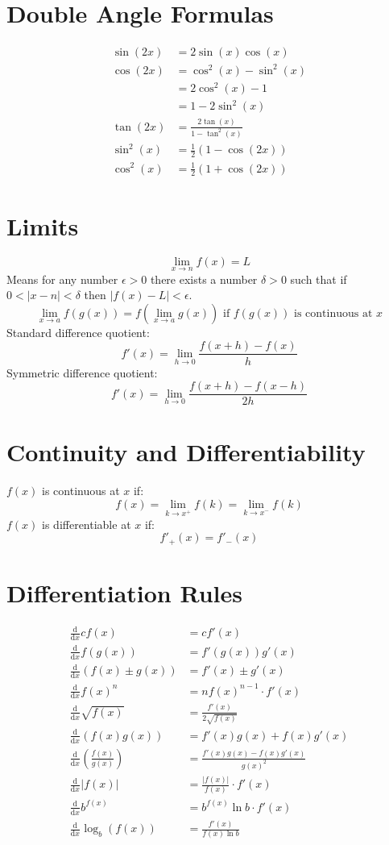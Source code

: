 \documentclass[12pt]{article}
\newcommand*{\rmaskip}{\setlength{\abovedisplayskip}{0pt}}
\newcommand*{\rmbskip}{\setlength{\belowdisplayskip}{0pt}}
\newcommand*{\rmskip}{\rmaskip \rmbskip}
\newcommand*{\dd}[3][]{\tfrac{\mathrm{d}^{#1}#2}{\mathrm{d}#3^{#1}}}
\begin{document}
\section*{Double Angle Formulas}
{\rmskip\begin{align*}
  \sin(2x) &= 2\sin(x)\cos(x)\\
  \cos(2x) &= \cos^2(x) - \sin^2(x)\\
    &= 2\cos^2(x) - 1\\
    &= 1-2\sin^2(x)\\
  \tan(2x) &= \frac{2\tan(x)}{1 - \tan^2(x)}\\
  \sin^2(x) &= \frac{1}{2}(1-\cos(2x))\\
  \cos^2(x) &= \frac{1}{2}(1+\cos(2x))
\end{align*}}%
\section*{Limits}
\[
  \lim_{x \to n} f(x) = L
\]
Means for any number \(\epsilon > 0\) there exists a number \(\delta > 0\) such
that if \(0 < |x - n| < \delta\) then \(|f(x) - L| < \epsilon\).
\[
  \lim_{x \to a}f(g(x)) = f\left(\lim_{x \to a}g(x)\right) \text{ if } f(g(x))
  \text{ is continuous at } x
\]
Standard difference quotient:
\[
  f'(x) = \lim_{h \to 0}\frac{f(x+h) - f(x)}{h}
\]
Symmetric difference quotient:
\[
  f'(x) = \lim_{h \to 0}\frac{f(x+h) - f(x-h)}{2h}
\]
\section*{Continuity and Differentiability}
\(f(x)\) is continuous at \(x\) if:
\[
  f(x) = \lim_{k \to x^+}f(k) = \lim_{k \to x^-}f(k)
\]
\(f(x)\) is differentiable at \(x\) if:
\[
  f'_+(x) = f'_-(x)
\]
\section*{Differentiation Rules}
{\rmskip\begin{align*}
  \dd{}{x}c f(x) &= c f'(x)\\
  \dd{}{x}f(g(x)) &= f'(g(x))g'(x)\\
  \dd{}{x}(f(x) \pm g(x)) &= f'(x) \pm g'(x)\\
  \dd{}{x}{f(x)}^n &= n{f(x)}^{n-1} \cdot f'(x)\\
  \dd{}{x}\sqrt{f(x)} &= \frac{f'(x)}{2\sqrt{f(x)}}\\
  \dd{}{x}(f(x)g(x)) &= f'(x)g(x) + f(x)g'(x)\\
  \dd{}{x}\left(\frac{f(x)}{g(x)}\right) &= \frac{f'(x)g(x) - f(x)g'(x)}
  {{g(x)}^2}\\
  \dd{}{x}|f(x)| &= \frac{|f(x)|}{f(x)} \cdot f'(x)\\
  \dd{}{x}b^{f(x)} &= b^{f(x)} \ln b \cdot f'(x)\\
  \dd{}{x}\log_b(f(x)) &= \frac{f'(x)}{f(x) \ln b}
\end{align*}}%
\end{document}
